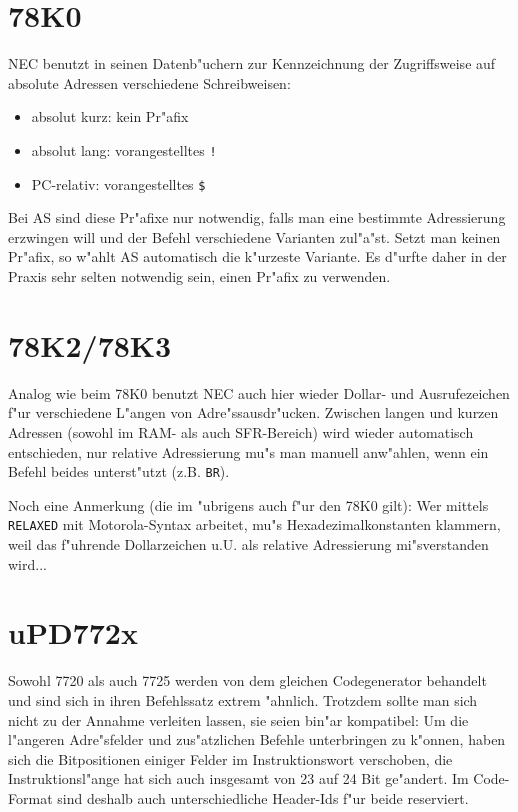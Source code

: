 \documentclass[12pt,a4paper,twoside]{report}
\begin{document}
{%

\section{78K0}
\label{78K0Spec}

NEC benutzt in seinen Datenb"uchern zur Kennzeichnung der Zugriffsweise
auf absolute Adressen verschiedene Schreibweisen:
\begin{itemize}
\item{absolut kurz: kein Pr"afix}
\item{absolut lang: vorangestelltes \verb"!"}
\item{PC-relativ: vorangestelltes \verb"$"}
\end{itemize}
Bei AS sind diese Pr"afixe nur notwendig, falls man eine bestimmte 
Adressierung erzwingen will und der Befehl verschiedene Varianten
zul"a"st.  Setzt man keinen Pr"afix, so w"ahlt AS automatisch die
k"urzeste Variante.  Es d"urfte daher in der Praxis sehr selten 
notwendig sein, einen Pr"afix zu verwenden.


\section{78K2/78K3}
\label{78K23Spec}

Analog wie beim 78K0 benutzt NEC auch hier wieder Dollar- und
Ausrufezeichen f"ur verschiedene L"angen von Adre"ssausdr"ucken.
Zwischen langen und kurzen Adressen (sowohl im RAM- als auch
SFR-Bereich) wird wieder automatisch entschieden, nur relative
Adressierung mu"s man manuell anw"ahlen, wenn ein Befehl beides
unterst"utzt (z.B. {\tt BR}).  

Noch eine Anmerkung (die im "ubrigens auch f"ur den 78K0 gilt): Wer
mittels {\tt RELAXED} mit Motorola-Syntax arbeitet, mu"s
Hexadezimalkonstanten klammern, weil das f"uhrende Dollarzeichen u.U. als
relative Adressierung mi"sverstanden wird...


\section{uPD772x}

Sowohl 7720 als auch 7725 werden von dem gleichen Codegenerator behandelt
und sind sich in ihren Befehlssatz extrem "ahnlich.  Trotzdem sollte man
sich nicht zu der Annahme verleiten lassen, sie seien bin"ar kompatibel:
Um die l"angeren Adre"sfelder und zus"atzlichen Befehle unterbringen zu
k"onnen, haben sich die Bitpositionen einiger Felder im Instruktionswort
verschoben, die Instruktionsl"ange hat sich auch insgesamt von 23 auf 24
Bit ge"andert.  Im Code-Format sind deshalb auch unterschiedliche
Header-Ids f"ur beide reserviert.

}
\end{document}

